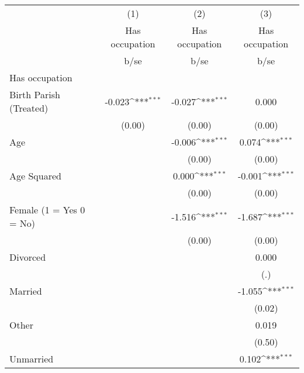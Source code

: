 {
\def\sym#1{\ifmmode^{#1}\else\(^{#1}\)\fi}
\begin{tabular}{l*{3}{c}}
\hline\hline
                    &\multicolumn{1}{c}{(1)}&\multicolumn{1}{c}{(2)}&\multicolumn{1}{c}{(3)}\\
                    &\multicolumn{1}{c}{Has occupation}&\multicolumn{1}{c}{Has occupation}&\multicolumn{1}{c}{Has occupation}\\
                    &        b/se         &        b/se         &        b/se         \\
\hline
Has occupation      &                     &                     &                     \\
Birth Parish (Treated)&      -0.023\sym{***}&      -0.027\sym{***}&       0.000         \\
                    &      (0.00)         &      (0.00)         &      (0.00)         \\
Age                 &                     &      -0.006\sym{***}&       0.074\sym{***}\\
                    &                     &      (0.00)         &      (0.00)         \\
Age Squared         &                     &       0.000\sym{***}&      -0.001\sym{***}\\
                    &                     &      (0.00)         &      (0.00)         \\
Female (1 = Yes 0 = No)&                     &      -1.516\sym{***}&      -1.687\sym{***}\\
                    &                     &      (0.00)         &      (0.00)         \\
Divorced            &                     &                     &       0.000         \\
                    &                     &                     &         (.)         \\
Married             &                     &                     &      -1.055\sym{***}\\
                    &                     &                     &      (0.02)         \\
Other               &                     &                     &       0.019         \\
                    &                     &                     &      (0.50)         \\
Unmarried           &                     &                     &       0.102\sym{***}\\

\end{tabular}}
